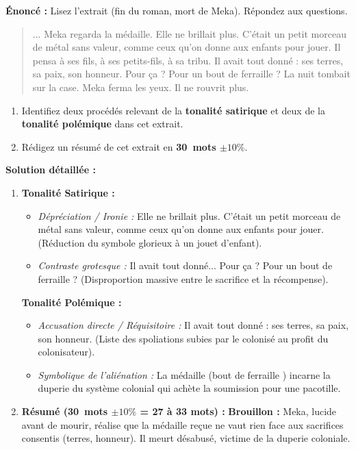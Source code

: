 \documentclass[11pt]{article}
\begin{document}
\begin{exoresolu}
\textbf{Énoncé :} Lisez l'extrait (fin du roman, mort de Meka). Répondez aux questions.
\begin{quote}
\og ... Meka regarda la médaille. Elle ne brillait plus. C'était un petit morceau de métal sans valeur, comme ceux qu'on donne aux enfants pour jouer. Il pensa à ses fils, à ses petits-fils, à sa tribu. Il avait tout donné : ses terres, sa paix, son honneur. Pour ça ? Pour un bout de ferraille ? La nuit tombait sur la case. Meka ferma les yeux. Il ne rouvrit plus. \fg
\end{quote}
\begin{enumerate}
    \item Identifiez deux procédés relevant de la \textbf{tonalité satirique} et deux de la \textbf{tonalité polémique} dans cet extrait.
    \item Rédigez un résumé de cet extrait en \textbf{30~mots $\pm 10\%$}.
\end{enumerate}
\tcblower
\textbf{Solution détaillée :}
\begin{enumerate}
    \item \textbf{Tonalité Satirique :}
    \begin{itemize}
        \item \emph{Dépréciation / Ironie :} \og Elle ne brillait plus. C'était un petit morceau de métal sans valeur, comme ceux qu'on donne aux enfants pour jouer. \fg{} (Réduction du symbole glorieux à un jouet d'enfant).
        \item \emph{Contraste grotesque :} \og Il avait tout donné... Pour ça ? Pour un bout de ferraille ? \fg{} (Disproportion massive entre le sacrifice et la récompense).
    \end{itemize}
    \textbf{Tonalité Polémique :}
    \begin{itemize}
        \item \emph{Accusation directe / Réquisitoire :} \og Il avait tout donné : ses terres, sa paix, son honneur. \fg{} (Liste des spoliations subies par le colonisé au profit du colonisateur).
        \item \emph{Symbolique de l'aliénation :} La médaille (\og bout de ferraille \fg{}) incarne la duperie du système colonial qui achète la soumission pour une pacotille.
    \end{itemize}
    \item \textbf{Résumé (30~mots $\pm 10\%$ = 27 à 33 mots) :}
    \textbf{Brouillon :} Meka, lucide avant de mourir, réalise que la médaille reçue ne vaut rien face aux sacrifices consentis (terres, honneur). Il meurt désabusé, victime de la duperie coloniale.

\end{enumerate}
\end{exoresolu}
\end{document}
